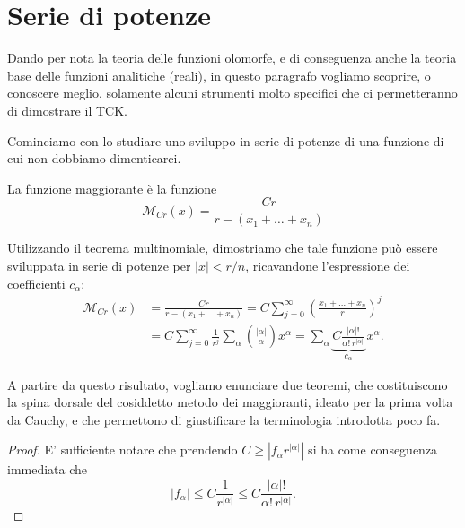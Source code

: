 \newpage
\section{Serie di potenze}\label{seriedipotenze}
Dando per nota la teoria delle funzioni olomorfe, e di conseguenza anche la teoria base delle funzioni analitiche (reali), in questo paragrafo vogliamo scoprire, o conoscere meglio, solamente alcuni strumenti molto specifici che ci permetteranno di dimostrare il TCK.

Cominciamo con lo studiare uno sviluppo in serie di potenze di una funzione di cui non dobbiamo dimenticarci.
\begin{definition}
La funzione maggiorante è la funzione $$\mathcal{M}_{Cr}(x)=\frac{Cr}{r-(x_1+\ldots +x_n)}$$
\end{definition}
Utilizzando il teorema multinomiale, dimostriamo che tale funzione può essere sviluppata in serie di potenze per $|x|<r/n$, ricavandone l'espressione dei coefficienti $c_\alpha$:
\begin{align*}
\mathcal{M}_{Cr}(x) &= \frac{Cr}{r-(x_1+\ldots +x_n)} = C \sum\limits_{j=0}^\infty \left(\frac{x_1+\ldots +x_n}{r}\right)^j  \\
&= C \sum\limits_{j=0}^\infty \frac{1}{r^j} \sum\limits_\alpha  \binom{|\alpha |}{\alpha } x^\alpha = \sum\limits_\alpha 
\underbrace{C \frac{|\alpha |!}{\alpha ! \, r^{|\alpha |}}}_{c_\alpha} \, x^\alpha .
\end{align*}

A partire da questo risultato, vogliamo enunciare due teoremi, che costituiscono la spina dorsale del cosiddetto metodo dei maggioranti, ideato per la prima volta da Cauchy, e che permettono di giustificare la terminologia introdotta poco fa.

\begin{theorem}\label{teomagg}
\end{theorem}


\begin{theorem}\label{costrmagg}
\end{theorem}

\begin{proof}
E' sufficiente notare che prendendo $C \geq |f_\alpha r^{|\alpha |}|$ si ha come conseguenza immediata che
$$|f_\alpha | \leq C \frac{1}{r^{|\alpha |}} \leq C \frac{|\alpha |!}{\alpha ! \, r^{|\alpha |}}.$$
\end{proof}


